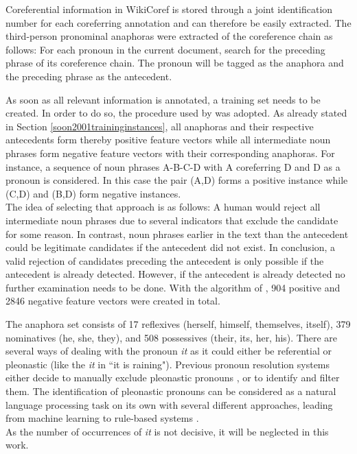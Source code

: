 Coreferential information in WikiCoref is stored through a joint identification number for each coreferring annotation and can therefore be easily extracted. The third-person pronominal anaphoras were extracted of the coreference chain as follows: For each pronoun in the current document, search for the preceding phrase of its coreference chain. The pronoun will be tagged as the anaphora and the preceding phrase as the antecedent. 

As soon as all relevant information is annotated, a training set needs to be created. In order to do so, the procedure used by \cite{soon2001machine} was adopted. As already stated in Section \ref{soon2001traininginstances}, all anaphoras and their respective antecedents form thereby positive feature vectors while all intermediate noun phrases form negative feature vectors with their corresponding anaphoras. For instance, a sequence of noun phrases A-B-C-D with A coreferring D and D as a pronoun is considered. In this case the pair (A,D) forms a positive instance while (C,D) and (B,D) form negative instances.\\
The idea of selecting that approach is as follows: A human would reject all intermediate noun phrases due to several indicators that exclude the candidate for some reason. In contrast, noun phrases earlier in the text than the antecedent could be legitimate candidates if the antecedent did not exist. In conclusion, a valid rejection of candidates preceding the antecedent is only possible if the antecedent is already detected. However, if the antecedent is already detected no further examination needs to be done. With the algorithm of \cite{soon2001machine}, 904 positive and 2846 negative feature vectors were created in total.

The anaphora set consists of 17 reflexives (herself, himself, themselves, itself), 379 nominatives (he, she, they), and 508 possessives (their, its, her, his). There are several ways of dealing with the pronoun \textit{it} as it could either be referential or pleonastic (like the \textit{it} in ``it is raining"). Previous pronoun resolution systems either decide to manually exclude pleonastic pronouns \citep{kennedy1996anaphora,bergsma2005automatic}, or to identify and filter them. The identification of pleonastic pronouns can be considered as a natural language processing task on its own with several different approaches, leading from machine learning \citep{boyd2005identifying} to rule-based systems \citep{lappin1994algorithm}.\\
As the number of occurrences of \textit{it} is not decisive, it will be neglected in this work.

